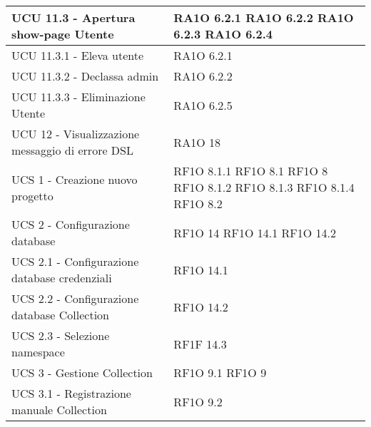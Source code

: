 \begin{center}
\begin{longtable}{ | p{5cm} | p{5cm} |}
						UCU 11.3 - Apertura show-page Utente &  RA1O 6.2.1 \newline  RA1O 6.2.2 \newline  RA1O 6.2.3 \newline  RA1O 6.2.4 \newline  \\ \hline      
						UCU 11.3.1 - Eleva utente &  RA1O 6.2.1 \newline  \\ \hline      
						UCU 11.3.2 - Declassa admin &  RA1O 6.2.2 \newline  \\ \hline      
						UCU 11.3.3 - Eliminazione Utente &  RA1O 6.2.5 \newline  \\ \hline      
						UCU 12 - Visualizzazione messaggio di errore DSL &  RA1O 18 \newline  \\ \hline      
						UCS 1 - Creazione nuovo progetto &  RF1O 8.1.1 \newline  RF1O 8.1  \newline  RF1O 8 \newline  RF1O 8.1.2 \newline  RF1O 8.1.3 \newline  RF1O 8.1.4 \newline  RF1O 8.2 \newline  \\ \hline      
						UCS 2 - Configurazione database &  RF1O 14 \newline  RF1O 14.1 \newline  RF1O 14.2 \newline  \\ \hline      
						UCS 2.1  - Configurazione database credenziali &  RF1O 14.1 \newline  \\ \hline      
						UCS 2.2  - Configurazione database Collection &  RF1O 14.2 \newline  \\ \hline      
						UCS 2.3  - Selezione namespace &  RF1F 14.3 \newline  \\ \hline      
						UCS 3 - Gestione Collection &  RF1O 9.1 \newline  RF1O 9 \newline  \\ \hline      
						UCS 3.1  - Registrazione manuale Collection &  RF1O 9.2 \newline  \\ \hline      

\end{longtable}
\end{center}
